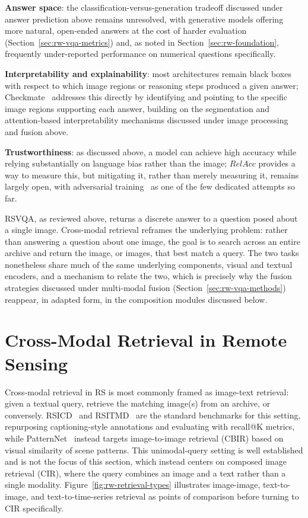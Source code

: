 \textbf{Answer space}: the classification-versus-generation tradeoff discussed under answer prediction above remains unresolved, with generative models offering more natural, open-ended answers at the cost of harder evaluation (Section~\ref{sec:rw-vqa-metrics}) and, as noted in Section~\ref{sec:rw-foundation}, frequently under-reported performance on numerical questions specifically. 

\textbf{Interpretability and explainability}: most architectures remain black boxes with respect to which image regions or reasoning steps produced a given answer; Checkmate~\cite{tosato2025checkmate} addresses this directly by identifying and pointing to the specific image regions supporting each answer, building on the segmentation and attention-based interpretability mechanisms discussed under image processing and fusion above. 

\textbf{Trustworthiness}: as discussed above, a model can achieve high accuracy while relying substantially on language bias rather than the image; $RelAcc$ provides a way to measure this, but mitigating it, rather than merely measuring it, remains largely open, with adversarial training~\cite{yuan2023badversarial} as one of the few dedicated attempts so far.

RSVQA, as reviewed above, returns a discrete answer to a question posed about a single image. Cross-modal retrieval reframes the underlying problem: rather than answering a question about one image, the goal is to search across an entire archive and return the image, or images, that best match a query. The two tasks nonetheless share much of the same underlying components, visual and textual encoders, and a mechanism to relate the two, which is precisely why the fusion strategies discussed under multi-modal fusion (Section~\ref{sec:rw-vqa-methods}) reappear, in adapted form, in the composition modules discussed below.
\section{Cross-Modal Retrieval in Remote Sensing}
\label{sec:rw-retrieval}

Cross-modal retrieval in RS is most commonly framed as image-text retrieval: given a textual query, retrieve the matching image(s) from an archive, or conversely. RSICD~\cite{lu2017exploring} and RSITMD~\cite{yuan2022exploring} are the standard benchmarks for this setting, repurposing captioning-style annotations and evaluating with recall@K metrics, while PatternNet~\cite{zhou2018patternnet} instead targets image-to-image retrieval (CBIR) based on visual similarity of scene patterns. This unimodal-query setting is well established and is not the focus of this section, which instead centers on composed image retrieval (CIR), where the query combines an image and a text rather than a single modality.  Figure~\ref{fig:rw-retrieval-types} illustrates image-image, text-to-image, and text-to-time-series retrieval as points of comparison before turning to CIR specifically.

